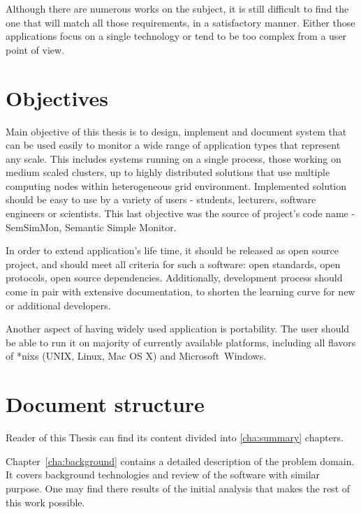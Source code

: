 Although there are numerous works on the subject, it is still difficult to find the one that will match all those requirements, in a satisfactory manner. Either those applications focus on a single technology or tend to be too complex from a user point of view.


\section{Objectives}
\label{ch1:Objectives}

Main objective of this thesis is to design, implement and document system that can be used easily to monitor a wide range of application types that represent any scale. This includes systems running on a single process, those working on medium scaled clusters, up to highly distributed solutions that use multiple computing nodes within heterogeneous grid environment. Implemented solution should be easy to use by a variety of users - students, lecturers, software engineers or scientists. This last objective was the source of project's code name - SemSimMon, Semantic Simple Monitor.

In order to extend application's life time, it should be released as open source project, and should meet all criteria for such a software: open standards, open protocols, open source dependencies. Additionally, development process should come in pair with extensive documentation, to shorten the learning curve for new or additional developers.

Another aspect of having widely used application is portability. The user should be able to run it on majority of currently available platforms, including all flavors of *nixs (UNIX, Linux, Mac OS X\textregistered) and Microsoft\textregistered~Windows\textregistered. 

\section{Document structure}
\label{ch1:docStructure}

Reader of this Thesis can find its content divided into \ref{cha:summary} chapters.

Chapter~\ref{cha:background} contains a detailed description of the problem domain. It covers background technologies and review of the software with similar purpose. One may find there results of the initial analysis that makes the rest of this work possible.

